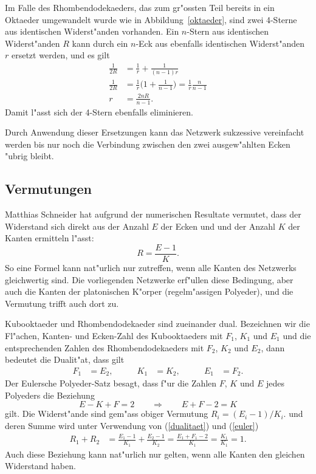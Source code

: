 \documentclass[a4paper,12pt]{article}
\begin{document}
Im Falle des Rhombendodekaeders, das zum gr"ossten Teil bereits in
ein Oktaeder umgewandelt wurde wie in Abbildung~\ref{oktaeder},
sind zwei 4-Sterne aus identischen Widerst"anden vorhanden.
Ein $n$-Stern aus identischen Widerst"anden $R$ kann durch ein $n$-Eck
aus ebenfalls identischen Widerst"anden $r$ ersetzt werden, und es
gilt
\begin{align*}
\frac{1}{2R}
&=
\frac{1}{r}+\frac{1}{(n-1)r}
\\
\frac{1}{2R}
&=
\frac{1}{r}
\biggl(1+\frac1{n-1}\biggr)
=
\frac{1}{r}\frac{n}{n-1}
\\
r&=\frac{2nR}{n-1}.
\end{align*}
Damit l"asst sich der 4-Stern ebenfalls eliminieren.

Durch Anwendung dieser Ersetzungen kann das Netzwerk sukzessive 
vereinfacht werden bis nur noch die Verbindung zwischen den zwei
ausgew"ahlten Ecken "ubrig bleibt.

\subsection{Vermutungen}
Matthias Schneider hat aufgrund der numerischen Resultate vermutet,
dass der Widerstand sich direkt aus der Anzahl $E$ der Ecken und
und der Anzahl $K$ der Kanten ermitteln l"asst:
\[
R=\frac{E-1}{K}.
\]
So eine Formel kann nat"urlich nur zutreffen, wenn alle Kanten
des Netzwerks gleichwertig sind. 
Die vorliegenden Netzwerke erf"ullen diese Bedingung, aber
auch die Kanten der platonischen K"orper (regelm"assigen Polyeder),
und die Vermutung trifft auch dort zu.

Kubooktaeder und Rhombendodekaeder sind zueinander dual.
Bezeichnen wir die Fl"achen\-, Kanten- und Ecken-Zahl des
Kubooktaeders mit $F_1$, $K_1$ und $E_1$ und die entsprechenden
Zahlen des Rhombendodekaeders mit $F_2$, $K_2$ und $E_2$, dann
bedeutet die Dualit"at, dass gilt
\begin{equation}
\begin{aligned}
F_1&=E_2,&\qquad
K_1&=K_2,&\qquad
E_1&=F_2.
\end{aligned}
\label{dualitaet}
\end{equation}
Der Eulersche Polyeder-Satz besagt, dass f"ur die Zahlen $F$, $K$ und $E$
jedes Polyeders die Beziehung
\begin{equation}
E-K+F=2
\qquad
\Rightarrow
\qquad
E+F-2=K
\label{euler}
\end{equation}
gilt.
Die Widerst"ande sind gem"ass obiger Vermutung $R_i=(E_i-1)/K_i$.
und deren Summe wird unter Verwendung von (\ref{dualitaet}) 
und (\ref{euler})
\begin{align*}
R_1+R_2
&=
\frac{E_1-1}{K_1}
+
\frac{E_2-1}{K_2}
=
\frac{E_1+F_1-2}{K_1}
=
\frac{K_1}{K_1}=1.
\end{align*}
Auch diese Beziehung kann nat"urlich nur gelten, wenn alle Kanten den
gleichen Widerstand haben.
\end{document}

